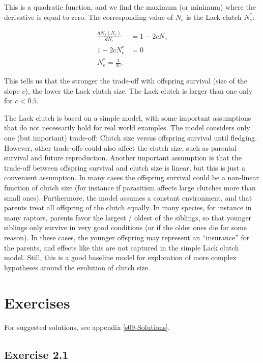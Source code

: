 \documentclass[
]{book}
\begin{document}
This is a quadratic function, and we find the maximum (or minimum) where the derivative is equal to zero. The corresponding value of \(N_e\) is the Lack clutch \(N_e^*\):

\begin{align}
\frac{dN_f(N_e)}{dN_e}&=1-2cN_e\\
1-2cN_e^*&=0\\
N_e^*=\frac{1}{2c}.
\end{align}

This tells us that the stronger the trade-off with offspring survival (size of the slope \(c\)), the lower the Lack clutch size. The Lack clutch is larger than one only for \(c<0.5\).

The Lack clutch is based on a simple model, with some important assumptions that do not necessarily hold for real world examples. The model considers only one (but important) trade-off: Clutch size versus offspring survival until fledging. However, other trade-offs could also affect the clutch size, such as parental survival and future reproduction. Another important assumption is that the trade-off between offspring survival and clutch size is linear, but this is just a convenient assumption. In many cases the offspring survival could be a non-linear function of clutch size (for instance if parasitism affects large clutches more than small ones). Furthermore, the model assumes a constant environment, and that parents treat all offspring of the clutch equally. In many species, for instance in many raptors, parents favor the largest / oldest of the siblings, so that younger siblings only survive in very good conditions (or if the older ones die for some reason). In these cases, the younger offspring may represent an ``insurance'' for the parents, and effects like this are not captured in the simple Lack clutch model. Still, this is a good baseline model for exploration of more complex hypotheses around the evolution of clutch size.

\hypertarget{exercises-1}{%
\section{Exercises}\label{exercises-1}}

For suggested solutions, see appendix \ref{s09-Solutions}.

\hypertarget{exercise-2.1}{%
\subsection*{Exercise 2.1}\label{exercise-2.1}}
\end{document}
